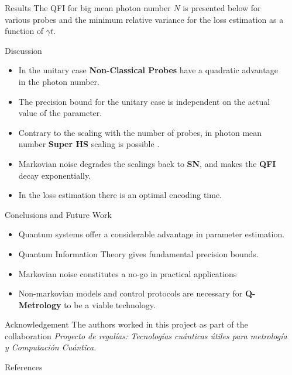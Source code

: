 \documentclass[final]{beamer}
\newlength{\sepwidth}
\newlength{\colwidth}
\newcommand{\separatorcolumn}{\begin{column}{\sepwidth}\end{column}}
\begin{document}
\begin{frame}[t]
\begin{columns}[t]
\begin{column}{\colwidth}
  \begin{exampleblock}{Results}
    The QFI for big mean photon number $N$ is presented below for various probes and  the minimum relative variance for the loss estimation as a function of $\gamma t$.
    
    \vspace{-0.1\linewidth}
    
    \vspace{-0.1\linewidth}
  \end{exampleblock}
\begin{alertblock}{Discussion}
  \begin{itemize}
    \item In the unitary case \textbf{Non-Classical Probes} have a quadratic advantage in the photon number.
    \item The precision bound for the unitary case is independent on the actual value of the parameter.
    \item Contrary to the scaling with the number of probes, in photon mean number  \textbf{Super HS} scaling is possible \cite{jiao_quantum_2023}.
    \item Markovian noise degrades the scalings back to \textbf{SN}, and makes the \textbf{QFI} decay exponentially.
    \item In the loss estimation there is an optimal encoding time.
  \end{itemize}
\end{alertblock}
\begin{alertblock}{Conclusions and Future Work}
  \begin{itemize}
    \item Quantum systems offer a considerable advantage in parameter estimation.
    \item Quantum Information Theory gives fundamental precision bounds.
    \item Markovian noise constitutes a no-go in practical applications
    \item Non-markovian models and control protocols are necessary for \textbf{Q-Metrology} to be a viable technology.
  \end{itemize}
\end{alertblock}
\begin{block}{Acknowledgement}
  The authors worked in this project as part of the collaboration \textit{Proyecto de regalías: Tecnologías cuánticas útiles para metrología y Computación Cuántica.}
  \end{block}
  \begin{block}{References}

\nocite{*}
    \small
    {
    \printbibliography{}}
  \end{block}


\end{column}
\separatorcolumn
\end{columns}
\end{frame}
\end{document}
